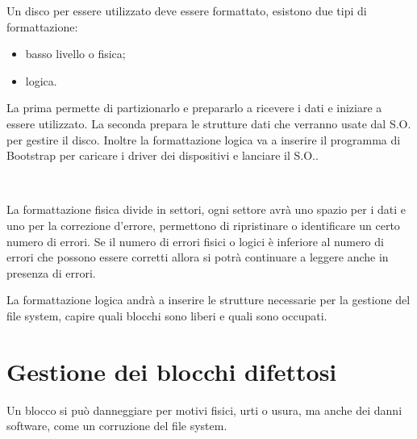 \documentclass[a4paper, 12pt]{book}
\begin{document}
Un disco per essere utilizzato deve essere formattato, 
esistono due tipi di formattazione:
\begin{itemize}
    \item basso livello o fisica;
    \item logica.
\end{itemize}
La prima permette di partizionarlo e prepararlo a ricevere 
i dati e iniziare a essere utilizzato. La seconda prepara 
le strutture dati che verranno usate dal S.O. per gestire 
il disco. Inoltre la formattazione logica va a inserire il 
programma di Bootstrap per caricare i driver dei dispositivi 
e lanciare il S.O..
\begin{figure}[h!]
    \centering
    \quad
    \\
    \quad
\end{figure}
La formattazione fisica divide in settori, ogni settore 
avrà uno spazio per i dati e uno per la correzione d'errore,
permettono di ripristinare o identificare un certo numero di 
errori. Se il numero di errori fisici o logici è inferiore 
al numero di errori che possono essere corretti allora si 
potrà continuare a leggere anche in presenza di errori.

La formattazione logica andrà a inserire le strutture 
necessarie per la gestione del file system, capire quali 
blocchi sono liberi e quali sono occupati. 

\section{Gestione dei blocchi difettosi}

Un blocco si può danneggiare per motivi fisici, urti o 
usura, ma anche dei danni software, come un corruzione 
del file system. 
\end{document}
